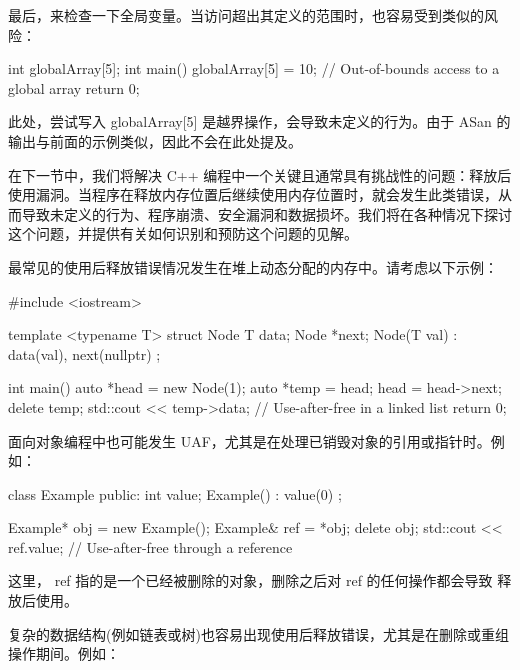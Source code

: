 
最后，来检查一下全局变量。当访问超出其定义的范围时，也容易受到类似的风险：

\begin{cpp}
int globalArray[5];
int main() {
    globalArray[5] = 10; // Out-of-bounds access to a global array
    return 0;
}
\end{cpp}

此处，尝试写入 globalArray[5] 是越界操作，会导致未定义的行为。由于 ASan 的输出与前面的示例类似，因此不会在此处提及。


在下一节中，我们将解决 C++ 编程中一个关键且通常具有挑战性的问题：释放后使用漏洞。当程序在释放内存位置后继续使用内存位置时，就会发生此类错误，从而导致未定义的行为、程序崩溃、安全漏洞和数据损坏。我们将在各种情况下探讨这个问题，并提供有关如何识别和预防这个问题的见解。


最常见的使用后释放错误情况发生在堆上动态分配的内存中。请考虑以下示例：

\begin{cpp}
#include <iostream>

template <typename T>
struct Node {
    T data;
    Node *next;
    Node(T val) : data(val), next(nullptr) {}
};

int main() {
    auto *head = new Node(1);
    auto *temp = head;
    head = head->next;
    delete temp;
    std::cout << temp->data; // Use-after-free in a linked list
    return 0;
}
\end{cpp}


面向对象编程中也可能发生 UAF，尤其是在处理已销毁对象的引用或指针时。例如：

\begin{cpp}
class Example {
    public:
    int value;
    Example() : value(0) {}
};

Example* obj = new Example();
Example& ref = *obj;
delete obj;
std::cout << ref.value; // Use-after-free through a reference
\end{cpp}

这里， ref 指的是一个已经被删除的对象，删除之后对 ref 的任何操作都会导致 释放后使用。


复杂的数据结构(例如链表或树)也容易出现使用后释放错误，尤其是在删除或重组操作期间。例如：

